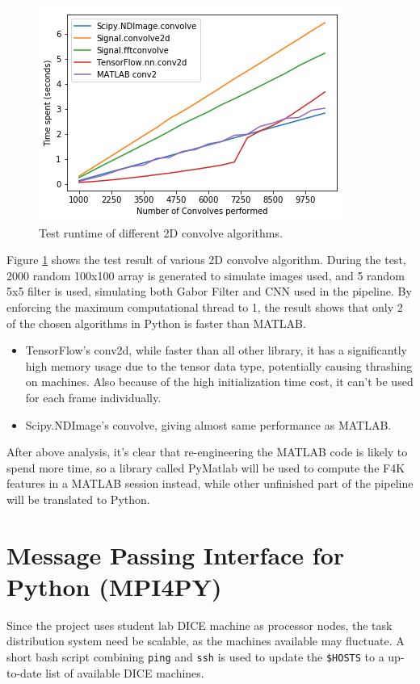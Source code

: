 \documentclass[bsc,logo,twoside,fullspacing,parskip]{infthesis}
\begin{document}
\begin{figure}[!t]
    \centering
    \includegraphics[scale=0.5]{graph/benchmark.png}
    \caption{Test runtime of different 2D convolve algorithms.}
    \label{fig:benchmark}
\end{figure}

Figure \ref{fig:benchmark} shows the test result of various 2D convolve algorithm. During the test, 2000 random 100x100 array is generated to simulate images used, and 5 random 5x5 filter is used, simulating both Gabor Filter and CNN used in the pipeline. By enforcing the maximum computational thread to 1, the result shows that only 2 of the chosen algorithms in Python is faster than MATLAB.
\begin{itemize}
\item
TensorFlow's conv2d, while faster than all other library, it has a significantly high memory usage due to the tensor data type, potentially causing thrashing on machines. Also because of the high initialization time cost, it can't be used for each frame individually.
\item
Scipy.NDImage's convolve, giving almost same performance as MATLAB.
\end{itemize}

After above analysis, it's clear that re-engineering the MATLAB code is likely to spend more time, so a library called PyMatlab will be used to compute the F4K features in a MATLAB session instead, while other unfinished part of the pipeline will be translated to Python.


\section{Message Passing Interface for Python (MPI4PY)}

Since the project uses student lab DICE machine as processor nodes, the task distribution system need be scalable, as the machines available may fluctuate.
A short bash script combining {\tt ping} and {\tt ssh} is used to update the {\tt \$HOSTS} to a up-to-date list of available DICE machines.
\end{document}
